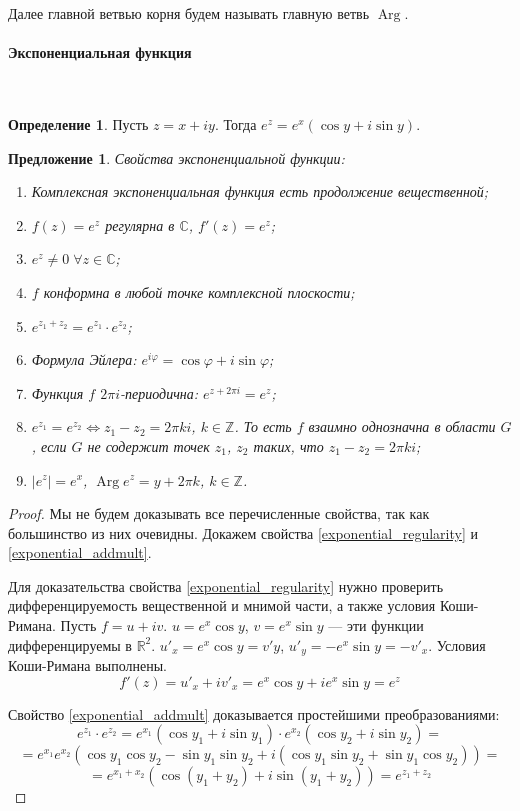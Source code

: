\documentclass[11pt,openany,a4paper]{scrartcl}
\theoremstyle{plain}
\newtheorem{proposition}[theorem]{Предложение}
\theoremstyle{definition}
\newtheorem{definition}[theorem]{Определение}
\newcommand\mb{\mathbb}
\newcommand\real{\mb R}
\newcommand{\complex}{\mb C}
\newcommand\lparagraph[1]{\paragraph{#1}\mbox{}\\}
\DeclareMathOperator{\Arg}{Arg}
\begin{document}
Далее главной ветвью корня будем называть главную ветвь $\Arg$.

\lparagraph{Экспоненциальная функция}

\begin{definition}
	Пусть $z = x + iy$. Тогда $e^z = e^x(\cos y + i\sin y)$.
\end{definition}

\begin{proposition}
	Свойства экспоненциальной функции:
\begin{enumerate}
	\item Комплексная экспоненциальная функция есть продолжение вещественной;
	\item\label{exponential_regularity} $f(z) = e^z$ регулярна в $\complex$, $f'(z) = e^z$;
	\item $e^z \neq 0\; \forall z \in \complex$;
	\item $f$ конформна в любой точке комплексной плоскости;
	\item\label{exponential_addmult} $e^{z_1+z_2} = e^{z_1}\cdot e^{z_2}$;
	\item Формула Эйлера: $e^{i\varphi} = \cos \varphi + i\sin \varphi$;
	\item Функция $f$ $2\pi i$-периодична: $e^{z + 2\pi i} = e^z$;
	\item $e^{z_1} = e^{z_2} \iff z_1 - z_2 = 2\pi ki$, $k \in \mb Z$. То есть $f$ взаимно
	однозначна в области $G$, если $G$ не содержит точек $z_1$, $z_2$ таких, что
	$z_1 - z_2 = 2\pi ki$;
	\item $|e^z| = e^x$, $\Arg e^z = y + 2\pi k$, $k \in \mb Z$.
\end{enumerate}
\end{proposition}
\begin{proof}
	Мы не будем доказывать все перечисленные свойства, так как большинство из них очевидны.
	Докажем свойства \ref{exponential_regularity} и \ref{exponential_addmult}.

	Для доказательства свойства \ref{exponential_regularity} нужно проверить дифференцируемость
	вещественной и мнимой части, а также условия Коши-Римана.
	Пусть $f = u + iv$. $u = e^x\cos y$, $v = e^x\sin y$ — эти функции дифференцируемы в $\real^2$.
	$u'_x = e^x\cos y = v'y$, $u'_y = -e^x\sin y = -v'_x$. Условия Коши-Римана выполнены.
	$$
	f'(z) = u'_x + iv'_x = e^x \cos y + ie^x\sin y = e^z
	$$

	Свойство \ref{exponential_addmult} доказывается простейшими преобразованиями:
	$$
	e^{z_1}\cdot e^{z_2} = e^{x_1}({\cos y_1 + i\sin y_1})\cdot e^{x_2}(\cos y_2 + i\sin y_2) =
	$$
	$$
	= e^{x_1}e^{x_2}(\cos y_1 \cos y_2 - \sin y_1 \sin y_2 + i(\cos y_1 \sin y_2 + \sin y_1 \cos y_2)) =
	$$
	$$
	= e^{x_1 + x_2}(\cos (y_1 + y_2) + i\sin (y_1 + y_2)) = e^{z_1 + z_2}
	$$
\end{proof}
\end{document}
